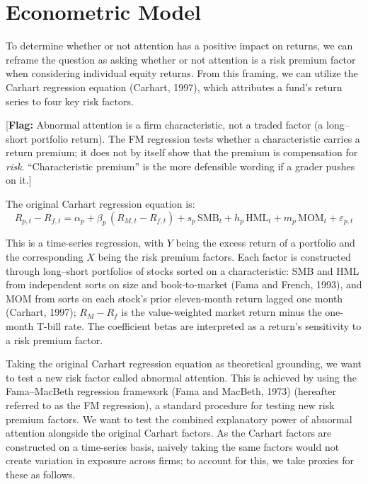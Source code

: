 \documentclass[11pt]{article}
\newcommand{\flag}[1]{{\color{red!75!black}\small [\textbf{Flag:} #1]}}
\newcommand{\filled}[1]{{\color{blue!70!black}#1}}   %
\begin{document}
\section{Econometric Model}

To determine whether or not attention has a positive impact on returns, we can reframe the question as asking whether or not attention is a risk premium factor when considering individual equity returns. From this framing, we can utilize the Carhart regression equation \filled{(Carhart, 1997)}, which attributes a fund's return series to four key risk factors.

\flag{Abnormal attention is a firm characteristic, not a traded factor (a long--short portfolio return). The FM regression tests whether a characteristic carries a return premium; it does not by itself show that the premium is compensation for \emph{risk}. ``Characteristic premium'' is the more defensible wording if a grader pushes on it.}

The original Carhart regression equation is:
\begin{equation}
R_{p,t} - R_{f,t} = \alpha_p + \beta_p\,(R_{M,t} - R_{f,t}) + s_p\,\text{SMB}_t + h_p\,\text{HML}_t + m_p\,\text{MOM}_t + \varepsilon_{p,t}
\end{equation}

This is a time-series regression, with $Y$ being the excess return of a portfolio and the corresponding $X$ being the risk premium factors. Each factor is constructed through \filled{long--short portfolios of stocks sorted on a characteristic: SMB and HML from independent sorts on size and book-to-market (Fama and French, 1993), and MOM from sorts on each stock's prior eleven-month return lagged one month (Carhart, 1997); $R_M - R_f$ is the value-weighted market return minus the one-month T-bill rate}. The coefficient betas are interpreted as a return's sensitivity to a risk premium factor.

Taking the original Carhart regression equation as theoretical grounding, we want to test a new risk factor called abnormal attention. This is achieved by using the Fama--MacBeth regression framework \filled{(Fama and MacBeth, 1973)} (hereafter referred to as the FM regression), a standard procedure for testing new risk premium factors. We want to test the combined explanatory power of abnormal attention alongside the original Carhart factors. As the Carhart factors are constructed on a time-series basis, naively taking the same factors would not create variation in exposure across firms; to account for this, we take proxies for these as follows.
\end{document}
